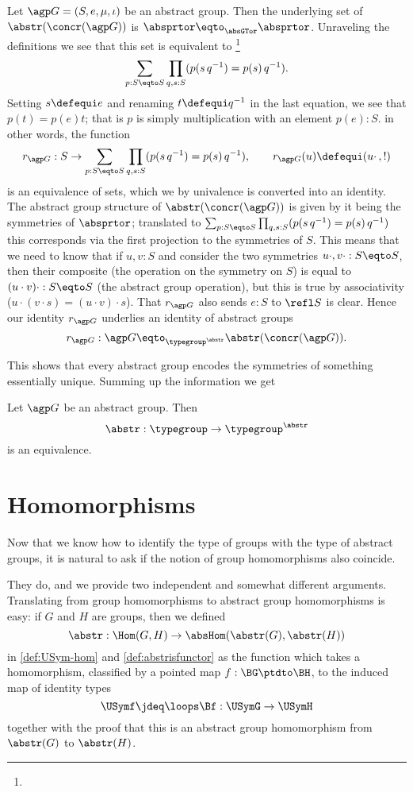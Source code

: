 \begin{example}
  \label{ex:abstrconcrG}
  Let ${\agp G}=(S,e,\mu,\iota)$ be an abstract group.
Then the underlying set of $\abstr(\concr({\agp G}))$ is 
$\absprtor \eqto_{\absGTor}\absprtor$.
Unraveling the definitions we see that this set is equivalent to%
\footnote{}
$$\sum_{p:S\eqto S}\prod_{q,s:S}(p(s\,q^{-1})=p(s)\,q^{-1}).
$$
Setting $s\defequi e$ and renaming $t\defequi q^{-1}$ in the last equation, we see that $p(t)=p(e)t$; that is $p$ is simply multiplication with an element $p(e):S$.  in other words, the function
$$r_{\agp G}:S\to  \sum_{p:S\eqto S}\prod_{q,s:S}(p(s\,q^{-1})=p(s)\,q^{-1}),\qquad r_{\agp G}(u)\defequi(u\cdot\,,!)
$$
is an equivalence of sets, which we by univalence is converted into an identity.
The abstract group structure of $\abstr(\concr({\agp G}))$ is given by it being the symmetries of $\absprtor$; translated to $\sum_{p:S\eqto S}\prod_{q,s:S}(p(s\,q^{-1})=p(s)\,q^{-1})$ this corresponds via the first projection to the symmetries of $S$.
This means that we need to know that if $u,v:S$ and consider the two symmetries $u\cdot,v\cdot:S\eqto S$, then their composite (the operation on the symmetry on $S$) is equal to $(u\cdot v)\cdot:S\eqto S$ (the abstract group operation), but this is true by associativity ($u\cdot(v\cdot s)=(u\cdot v)\cdot s$).  That $r_{\agp G}$ also sends $e:S$ to $\refl S$ is clear.
Hence our identity $r_{\agp G}$ underlies an identity of abstract groups
$$r_{\agp G}:{\agp G}\eqto_{\typegroup^{\abstr}}\abstr(\concr({\agp G})).$$
\end{example}

This shows that every abstract group encodes the symmetries of something essentially unique.  Summing up the information we get
\begin{theorem}
  \label{thm:Groupsareidentitytypes}
  Let ${\agp G}$ be an abstract group. Then
$${\abstr}:\typegroup\to\typegroup^{\abstr}$$ is an equivalence.
\end{theorem}

\section{Homomorphisms}
\label{sec:homabsisconcr}

Now that we know how to identify the type of groups with the type 
of abstract groups, it is natural to ask if the notion of group 
homomorphisms also coincide.

They do, and we provide two independent and somewhat different arguments.
Translating from group homomorphisms to abstract group homomorphisms is easy:
if $G$ and $H$ are groups, then we defined
$$\abstr:\Hom(G,H)\to\absHom(\abstr(G),\abstr(H))$$
in \cref{def:USym-hom} and \cref{def:abstrisfunctor} as the function
which takes a homomorphism, classified by a pointed map $f:\BG\ptdto\BH$,
to the induced map of identity types
$$\USymf \jdeq \loops\Bf:\USymG\to\USymH$$
together with the proof that this is an abstract group 
homomorphism from $\abstr(G)$ to $\abstr(H)$.

